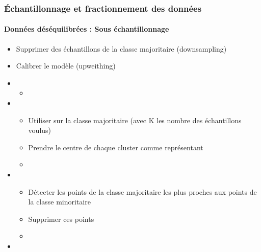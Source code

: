 \documentclass[xcolor=table]{beamer}
\begin{document}
\begin{frame}
	\frametitle{Échantillonnage et fractionnement des données}
	\framesubtitle{Données déséquilibrées : Sous échantillonnage}
	
	\begin{itemize}
		\item Supprimer des échantillons de la classe majoritaire (downsampling)
		\item Calibrer le modèle (upweithing)
		\item {}
		\begin{itemize}
			\item {}
		\end{itemize}
		\item {}
		\begin{itemize}
			\item Utiliser   sur la classe majoritaire (avec K les nombre des échantillons voulus)
			\item Prendre le centre de chaque cluster comme représentant
			\item {}
		\end{itemize}
		\item {}
		\begin{itemize}
			\item Détecter les points de la classe majoritaire les plus proches aux points de la classe minoritaire
			\item Supprimer ces points
			\item {}
		\end{itemize}
		\item {}
	\end{itemize}
	
\end{frame}
\end{document}
